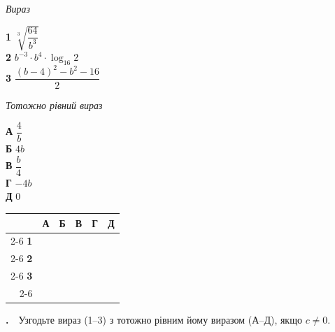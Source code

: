 \documentclass[12pt]{article}
\newcommand{\matchingGrid}{%
    \begingroup
    \renewcommand{\arraystretch}{1.15}
    \setlength{\tabcolsep}{4pt}
    \footnotesize
    \begin{tabular}{r|c|c|c|c|c|}
         \multicolumn{1}{c}{} & \multicolumn{1}{c}{\textbf{А}} & \multicolumn{1}{c}{\textbf{Б}} & \multicolumn{1}{c}{\textbf{В}} & \multicolumn{1}{c}{\textbf{Г}} & \multicolumn{1}{c}{\textbf{Д}} \\ \cline{2-6}
         \textbf{1} & \phantom{X} & \phantom{X} & \phantom{X} & \phantom{X} & \phantom{X} \\ \cline{2-6}
         \textbf{2} & & & & & \\ \cline{2-6}
         \textbf{3} & & & & & \\ \cline{2-6}
    \end{tabular}
    \endgroup
}
\newcounter{zad}
\newcommand{\zadnum}{\stepcounter{zad}\textbf{\thezad.}\ \ }
\begin{document}
\vspace{0.3cm}
\noindent
\begin{minipage}[t]{0.42\textwidth}
\textit{Вираз}\par\vspace{0.2cm}
\textbf{1} \quad $\sqrt[3]{\dfrac{64}{b^3}}$\\[0.55cm]
\textbf{2} \quad $b^{-3}\cdot b^4 \cdot \log_{16} 2$\\[0.4cm]
\textbf{3} \quad $\dfrac{(b-4)^2 - b^2 - 16}{2}$
\end{minipage}
\hfill
\begin{minipage}[t]{0.3\textwidth}
\textit{Тотожно рівний вираз}\par\vspace{0.2cm}
\textbf{А} \quad $\dfrac{4}{b}$\\[0.25cm]
\textbf{Б} \quad $4b$\\[0.2cm]
\textbf{В} \quad $\dfrac{b}{4}$\\[0.25cm]
\textbf{Г} \quad $-4b$\\[0.2cm]
\textbf{Д} \quad $0$
\end{minipage}
\hfill
\begin{minipage}[t]{0.2\textwidth}
\vspace{0.5cm}
\begin{flushright}\matchingGrid\end{flushright}
\end{minipage}

\vspace{0.4cm}
\noindent\zadnum Узгодьте вираз (1--3) з тотожно рівним йому виразом (А--Д), якщо $c \neq 0$.
\end{document}
